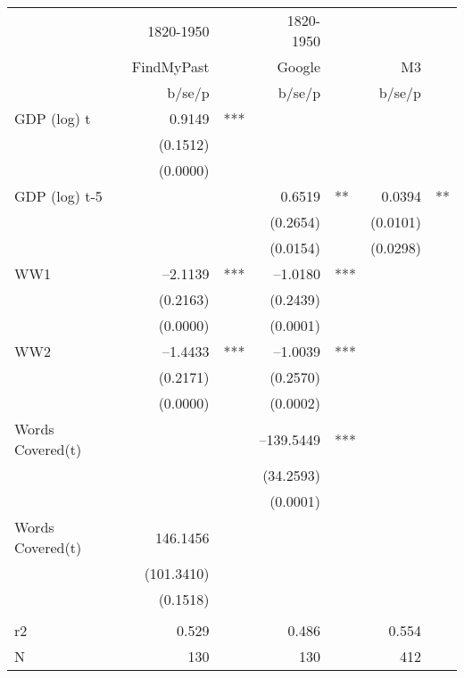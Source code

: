 \begin{tabular} {l* {3}{r @{} l}}
\hline
            &   1820-1950&   &   1820-1950&   &            &   \\
            &  FindMyPast&   &      Google&   &          M3&   \\
            &      b/se/p&   &      b/se/p&   &      b/se/p&   \\
\hline
GDP (log) t &      0.9149&***&            &   &            &   \\
            &    (0.1512)&   &            &   &            &   \\
            &    (0.0000)&   &            &   &            &   \\
GDP (log) t-5&            &   &      0.6519&** &      0.0394&** \\
            &            &   &    (0.2654)&   &    (0.0101)&   \\
            &            &   &    (0.0154)&   &    (0.0298)&   \\
WW1         &    --2.1139&***&    --1.0180&***&            &   \\
            &    (0.2163)&   &    (0.2439)&   &            &   \\
            &    (0.0000)&   &    (0.0001)&   &            &   \\
WW2         &    --1.4433&***&    --1.0039&***&            &   \\
            &    (0.2171)&   &    (0.2570)&   &            &   \\
            &    (0.0000)&   &    (0.0002)&   &            &   \\
Words Covered(t)&            &   &  --139.5449&***&            &   \\
            &            &   &   (34.2593)&   &            &   \\
            &            &   &    (0.0001)&   &            &   \\
Words Covered(t)&    146.1456&   &            &   &            &   \\
            &  (101.3410)&   &            &   &            &   \\
            &    (0.1518)&   &            &   &            &   \\
 \\
r2          &       0.529&   &       0.486&   &       0.554&   \\
N           &         130&   &         130&   &         412&   \\
\hline
\end{tabular}
